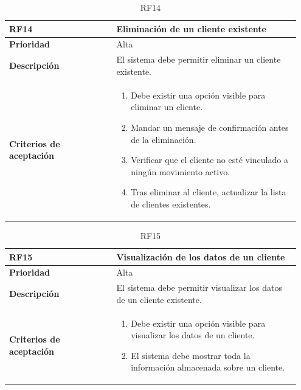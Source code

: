 \begin{table}[H]
	\centering %
	\begin{tabular}{|p{0.35\linewidth}|p{0.6\linewidth}|}
		\hline
		\rowcolor{grayshade} \textbf{RF14} & \textbf{Eliminación de un cliente existente} \\
		\hline
		\textbf{Prioridad} & Alta \\
		\hline
		\textbf{Descripción} & El sistema debe permitir eliminar un cliente existente.\\
		\hline
		\vspace{0.5mm}
		\textbf{Criterios de aceptación} & 
		\begin{minipage}[t]{0.9\linewidth}
			\begin{enumerate}
				\item Debe existir una opción visible para eliminar un cliente. 
				\item Mandar un mensaje de confirmación antes de la eliminación. 
				\item Verificar que el cliente no esté vinculado a ningún movimiento activo.
				\item Tras eliminar al cliente, actualizar la lista de clientes existentes. 
			\end{enumerate}
			\vspace{2mm}
		\end{minipage} \\
		\hline
	\end{tabular}
	\caption{RF14}
\end{table}

\begin{table}[H]
	\centering %
	\begin{tabular}{|p{0.35\linewidth}|p{0.6\linewidth}|}
		\hline
		\rowcolor{grayshade} \textbf{RF15} & \textbf{Visualización de los datos de un cliente} \\
		\hline
		\textbf{Prioridad} & Alta \\
		\hline
		\textbf{Descripción} & El sistema debe permitir visualizar los datos de un cliente existente.\\
		\hline
		\vspace{0.5mm}
		\textbf{Criterios de aceptación} & 
		\begin{minipage}[t]{0.9\linewidth}
			\begin{enumerate}
				\item Debe existir una opción visible para visualizar los datos de un cliente. 
				\item El sistema debe mostrar toda la información almacenada sobre un cliente. 
			\end{enumerate}
			\vspace{2mm}
		\end{minipage} \\
		\hline
	\end{tabular}
	\caption{RF15}
\end{table}

